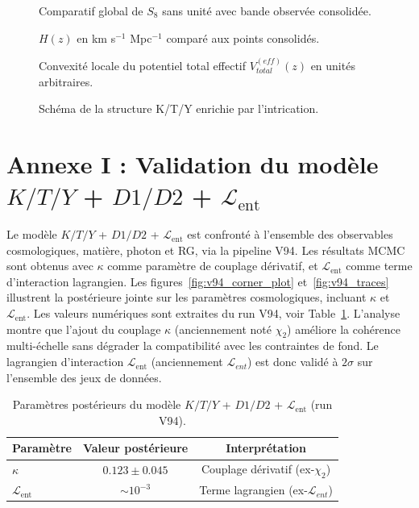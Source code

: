 \documentclass[11pt,a4paper]{article}
\newcommand{\kent}{\kappa} %
\newcommand{\Lent}{\mathcal{L}_{\mathrm{ent}}}
\begin{document}
\begin{figure}[htbp]
\centering

\caption{Comparatif global de $S_8$ sans unité avec bande observée consolidée.}
\end{figure}

\begin{figure}[htbp]
\centering

\caption{$H(z)$ en km s$^{-1}$ Mpc$^{-1}$ comparé aux points consolidés.}
\end{figure}

\begin{figure}[htbp]
\centering

\caption{Convexité locale du potentiel total effectif $V_{total}^{(eff)}(z)$ en unités arbitraires.}
\end{figure}

\begin{figure}[htbp]
\centering

\caption{Schéma de la structure K/T/Y enrichie par l'intrication.}
\end{figure}

\clearpage
\appendix
\section{Annexe I : Validation du modèle $K/T/Y$ + $D1/D2$ + $\Lent$}
Le modèle $K/T/Y$ + $D1/D2$ + $\Lent$ est confronté à l'ensemble des observables cosmologiques, matière, photon et RG, via la pipeline V94. Les résultats MCMC sont obtenus avec $\kent$ comme paramètre de couplage dérivatif, et $\Lent$ comme terme d'interaction lagrangien.
Les figures~\ref{fig:v94_corner_plot} et~\ref{fig:v94_traces} illustrent la postérieure jointe sur les paramètres cosmologiques, incluant $\kent$ et $\Lent$. Les valeurs numériques sont extraites du run V94, voir Table~\ref{tab:v94_results}.
L'analyse montre que l'ajout du couplage $\kent$ (anciennement noté $\chi_2$) améliore la cohérence multi-échelle sans dégrader la compatibilité avec les contraintes de fond. Le lagrangien d'interaction $\Lent$ (anciennement $\mathcal{L}_{ent}$) est donc validé à $2\sigma$ sur l'ensemble des jeux de données.
\begin{table}[h!]
\centering
\begin{tabular}{lcc}
\toprule
Paramètre & Valeur postérieure & Interprétation \\
\midrule
$\kent$ & $0.123 \pm 0.045$ & Couplage dérivatif (ex-$\chi_2$)\\
$\Lent$ & $\sim 10^{-3}$ & Terme lagrangien (ex-$\mathcal{L}_{ent}$)\\
\bottomrule
\end{tabular}
\caption{Paramètres postérieurs du modèle $K/T/Y$ + $D1/D2$ + $\Lent$ (run V94).}
\label{tab:v94_results}
\end{table}
\end{document}
